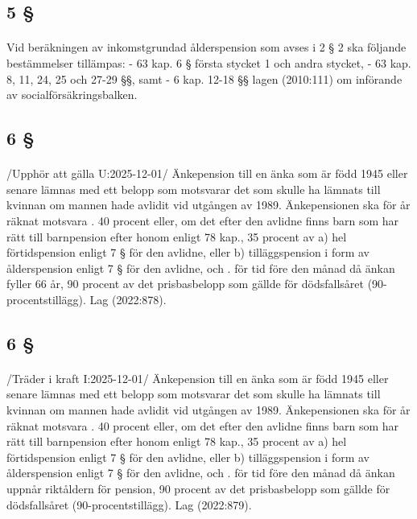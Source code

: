 \documentclass[a4paper,notitlepage,openany,10pt]{book}
\begin{document}
\subsection*{5 §}
\paragraph*{}
Vid beräkningen av inkomstgrundad ålderspension som avses i 2 § 2 ska följande bestämmelser tillämpas:
\newline - 63 kap. 6 § första stycket 1 och andra stycket,
\newline - 63 kap. 8, 11, 24, 25 och 27-29 §§, samt
\newline - 6 kap. 12-18 §§ lagen (2010:111) om införande av socialförsäkringsbalken.
\subsection*{6 §}
\paragraph*{}
/Upphör att gälla U:2025-12-01/
Änkepension till en änka som är född 1945 eller senare lämnas med ett belopp som motsvarar det som skulle ha lämnats till kvinnan om mannen hade avlidit vid utgången av 1989. Änkepensionen ska för år räknat motsvara
. 40 procent eller, om det efter den avlidne finns barn som har rätt till barnpension efter honom enligt 78 kap., 35 procent av
a) hel förtidspension enligt 7 § för den avlidne, eller
b) tilläggspension i form av ålderspension enligt 7 § för den avlidne, och
. för tid före den månad då änkan fyller 66 år, 90 procent av det prisbasbelopp som gällde för dödsfallsåret (90- procentstillägg).
Lag (2022:878).
\subsection*{6 §}
\paragraph*{}
/Träder i kraft I:2025-12-01/
Änkepension till en änka som är född 1945 eller senare lämnas med ett belopp som motsvarar det som skulle ha lämnats till kvinnan om mannen hade avlidit vid utgången av 1989. Änkepensionen ska för år räknat motsvara
. 40 procent eller, om det efter den avlidne finns barn som har rätt till barnpension efter honom enligt 78 kap., 35 procent av
a) hel förtidspension enligt 7 § för den avlidne, eller
b) tilläggspension i form av ålderspension enligt 7 § för den avlidne, och
. för tid före den månad då änkan uppnår riktåldern för pension, 90 procent av det prisbasbelopp som gällde för dödsfallsåret (90-procentstillägg).
Lag (2022:879).
\end{document}

